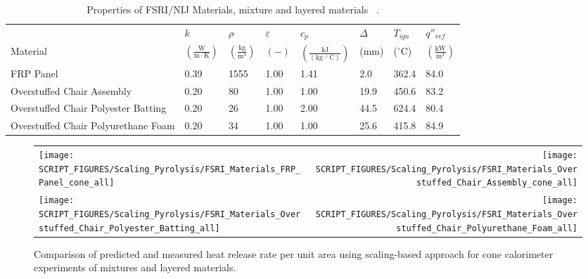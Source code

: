 \begin{table}[!h]
\caption[Properties of FSRI/NIJ Materials, mixture and layered materials]{Properties of FSRI/NIJ Materials, mixture and layered materials ~\cite{McKinnon:FSRI2023_Data}.}
\centering
\begin{tabular}{|p{5.5cm}|p{1.0cm}|p{1.0cm}|p{0.8cm}|p{1.4cm}|p{1.0cm}|p{1.0cm}|p{1.2cm}|}
\hline
                                               & $k$    & $\rho$      & $\varepsilon$   & $c_{p}$ & $\Delta$    & $T_{ign}$ & $q''_{ref}$ \\
Material                                       & $\mathrm{\left(\frac{W}{m\cdot K}\right)}$ & $\mathrm{\left(\frac{kg}{m^{3}}\right)}$ & $\mathrm{( - )}$ & $\mathrm{\left(\frac{kJ}{(kg\cdot ^{\circ}C)}\right)}$ &  ($\mathrm{mm}$)   & ($\mathrm{^{\circ}C}$) & $\mathrm{\left(\frac{kW}{m^{2}}\right)}$ \\ \hline
\hline
FRP Panel & 0.39 & 1555 & 1.00 & 1.41 & 2.0 & 362.4 & 84.0 \\ \hline
Overstuffed Chair Assembly & 0.20 & 80 & 1.00 & 1.00 & 19.9 & 450.6 & 83.2 \\ \hline
Overstuffed Chair Polyester Batting & 0.20 & 26 & 1.00 & 2.00 & 44.5 & 624.4 & 80.4 \\ \hline
Overstuffed Chair Polyurethane Foam & 0.20 & 34 & 1.00 & 1.00 & 25.6 & 415.8 & 84.9 \\ \hline
\end{tabular}
\label{Properties_FSRI_NIJ_Materials_mixtures}
\end{table}

\begin{figure}[p]
\begin{tabular*}{\textwidth}{l@{\extracolsep{\fill}}r}
\texttt{[image: SCRIPT\_FIGURES/Scaling\_Pyrolysis/FSRI\_Materials\_FRP\_Panel\_cone\_all]} &
\texttt{[image: SCRIPT\_FIGURES/Scaling\_Pyrolysis/FSRI\_Materials\_Overstuffed\_Chair\_Assembly\_cone\_all]} \\
\texttt{[image: SCRIPT\_FIGURES/Scaling\_Pyrolysis/FSRI\_Materials\_Overstuffed\_Chair\_Polyester\_Batting\_all]} &
\texttt{[image: SCRIPT\_FIGURES/Scaling\_Pyrolysis/FSRI\_Materials\_Overstuffed\_Chair\_Polyurethane\_Foam\_all]} \\
\end{tabular*}
\caption[HRRPUA of FSRI materials using scaling model, mixtures and layered materials]
{Comparison of predicted and measured heat release rate per unit area using scaling-based approach for cone calorimeter experiments of mixtures and layered materials.}
\label{FSRI_Materials_mixtures}
\end{figure}

